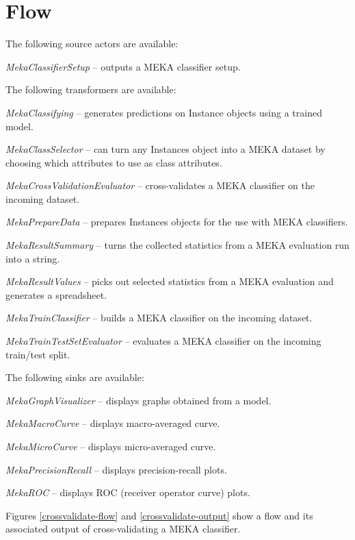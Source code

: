 \documentclass[a4paper]{book}
\begin{document}
\chapter{Flow}
The following source actors are available:
\begin{tight_itemize}
	\item \textit{MekaClassifierSetup} -- outputs a MEKA classifier setup.
\end{tight_itemize}
The following transformers are available:
\begin{tight_itemize}
	\item \textit{MekaClassifying} -- generates predictions on Instance objects
	using a trained model.
	\item \textit{MekaClassSelector} -- can turn any Instances object into
	a MEKA dataset by choosing which attributes to use as class attributes.
	\item \textit{MekaCrossValidationEvaluator} -- cross-validates a MEKA 
	classifier on the incoming dataset.
	\item \textit{MekaPrepareData} -- prepares Instances objects for the 
	use with MEKA classifiers.
	\item \textit{MekaResultSummary} -- turns the collected statistics from
	a MEKA evaluation run into a string.
	\item \textit{MekaResultValues} -- picks out selected statistics from a
	MEKA evaluation and generates a spreadsheet.
	\item \textit{MekaTrainClassifier} -- builds a MEKA classifier on the
	incoming dataset.
	\item \textit{MekaTrainTestSetEvaluator} -- evaluates a MEKA classifier
	on the incoming train/test split.
\end{tight_itemize}
The following sinks are available:
\begin{tight_itemize}
	\item \textit{MekaGraphVisualizer} -- displays graphs obtained from a model.
	\item \textit{MekaMacroCurve} -- displays macro-averaged curve.
	\item \textit{MekaMicroCurve} -- displays micro-averaged curve.
	\item \textit{MekaPrecisionRecall} -- displays precision-recall plots.
	\item \textit{MekaROC} -- displays ROC (receiver operator curve) plots.
\end{tight_itemize}

\newpage
Figures \ref{crossvalidate-flow} and \ref{crossvalidate-output} show a flow
and its associated output of cross-validating a MEKA classifier.
\end{document}
